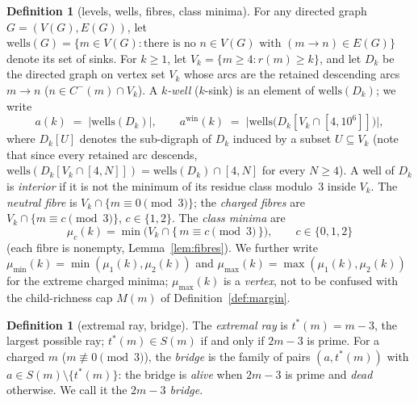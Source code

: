 \documentclass[11pt]{article}
\theoremstyle{plain}
\theoremstyle{definition}
\newtheorem{definition}[theorem]{Definition}
\newcommand{\rays}{S}
\newcommand{\rch}{r}
\newcommand{\Vk}{V_{k}}
\newcommand{\Dk}{D_{k}}
\newcommand{\tstar}{t^{\ast}}
\newcommand{\wells}{\mathrm{wells}}
\begin{document}
\begin{definition}[levels, wells, fibres, class minima]
\label{def:levels}
For any directed graph $G = (V(G), E(G))$, let
$\wells(G) = \{m \in V(G) : \text{there is no } n \in V(G)
\text{ with } (m \to n) \in E(G)\}$ denote its set of sinks.
For $k \ge 1$, let $\Vk = \{m \ge 4 : \rch(m) \ge k\}$, and let
$\Dk$ be the directed graph on vertex set $\Vk$ whose arcs are the
retained descending arcs $m \to n$ ($n \in C^{-}(m) \cap \Vk$). A
\emph{$k$-well} ($k$-sink) is an element of $\wells(\Dk)$; we write
\[
a(k) \;=\; |\wells(\Dk)|,
\qquad
a^{\mathrm{win}}(k) \;=\; \bigl|\wells\bigl(\Dk[\Vk \cap [4,10^{6}]]\bigr)\bigr|,
\]
where $\Dk[U]$ denotes the sub-digraph of $\Dk$ induced by a subset
$U \subseteq \Vk$ (note that since every retained arc descends,
$\wells(\Dk[\Vk \cap [4,N]]) = \wells(\Dk) \cap [4,N]$ for every
$N \ge 4$). A well of $\Dk$ is \emph{interior} if it is not the
minimum of its residue class modulo~$3$ inside $\Vk$. The
\emph{neutral fibre} is $\Vk \cap \{m \equiv 0 \pmod 3\}$; the
\emph{charged fibres} are $\Vk \cap \{m \equiv c \pmod 3\}$,
$c \in \{1,2\}$. The \emph{class minima} are
\[
\mu_c(k) = \min \bigl(\Vk \cap \{\,m \equiv c \pmod 3\,\}\bigr),
\qquad c \in \{0,1,2\}
\]
(each fibre is nonempty, Lemma~\ref{lem:fibres}). We further write
$\mu_{\min}(k) = \min(\mu_1(k),\mu_2(k))$ and
$\mu_{\max}(k) = \max(\mu_1(k),\mu_2(k))$ for the extreme charged
minima; $\mu_{\max}(k)$ is a \emph{vertex}, not to be confused with
the child-richness cap $M(m)$ of Definition~\ref{def:margin}.
\end{definition}

\begin{definition}[extremal ray, bridge]\label{def:bridge}
The \emph{extremal ray} is $\tstar(m) = m-3$, the largest possible
ray; $\tstar(m) \in \rays(m)$ if and only if $2m-3$ is prime. For a
charged $m$ ($m \not\equiv 0 \pmod 3$), the \emph{bridge} is the
family of pairs $(a,\tstar(m))$ with
$a \in \rays(m) \setminus \{\tstar(m)\}$: the bridge is \emph{alive}
when $2m-3$ is prime and \emph{dead} otherwise. We call it the
\emph{$2m-3$ bridge}.
\end{definition}
\end{document}
